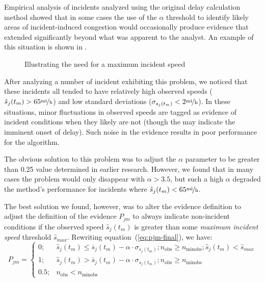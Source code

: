 \documentclass[12pt]{report}
\begin{document}
Empirical analysis of incidents analyzed using the original delay calculation
method showed that in some cases the use of the $\alpha$ threshold to identify
likely areas of incident-induced congestion would occasionally produce evidence
that extended significantly beyond what was apparent to the analyst.  An example
of this situation is shown in .
\begin{figure}[t]
  \centering
  \caption{Illustrating the need for a maximum incident speed}
  \label{fig:max-inc-spd}
\end{figure}

After analyzing a number of incident exhibiting this problem, we noticed that
these incidents all tended to have relatively high observed speeds
($\hat{s}_j(t_m)>65\unitfrac{mi}{h}$) and low standard deviations
($\sigma_{s_j(t_m)}<2\unitfrac{mi}{h}$).  In these situations, minor
fluctuations in observed speeds are tagged as evidence of incident conditions
when they likely are not (though the may indicate the imminent onset of delay).
Such noise in the evidence results in poor performance for the algorithm.

The obvious solution to this problem was to adjust the $\alpha$ parameter to be
greater than 0.25 value determined in earlier research.  However, we found that
in many cases the problem would only disappear with $\alpha>3.5$, but such a
high $\alpha$ degraded the method's performance for incidents where
$\hat{s}_j(t_m)<65\unitfrac{mi}{h}$.

The best solution we found, however, was to alter the evidence
definition to adjust the definition of the evidence $P_{jm}$ to always
indicate non-incident conditions if the observed speed
$\hat{s}_j(t_m)$ is greater than some \emph{maximum incident speed}
threshold $\hat{s}_{max}$.  Rewriting equation~(\ref{eq:pjm-final}),
we have:
\begin{equation}
  \label{eq:pjm-final-2}
  P_{jm} = 
  \begin{cases}
    0;& \hat{s}_j(t_m) \le \overline{s}_j(t_m) - \alpha\cdot\sigma_{s_j(t_m)}; n_{\mathrm{obs}} \ge n_{\textrm{minobs}};\hat{s}_j(t_m) < \hat{s}_{max} \\
    1;& \hat{s}_j(t_m) > \overline{s}_j(t_m) - \alpha\cdot\sigma_{s_j(t_m)}; n_{\mathrm{obs}} \ge n_{\textrm{minobs}}\\
    0.5;& n_{\mathrm{obs}} < n_{\textrm{minobs}}
  \end{cases}
\end{equation}
\end{document}
